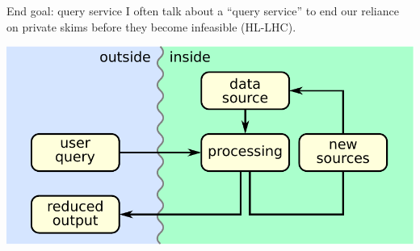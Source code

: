 \documentclass[aspectratio=169]{beamer}
\begin{document}
\begin{frame}{End goal: query service}
\large
\vspace{0.5 cm}
I often talk about a ``query service'' to end our reliance on private skims before they become infeasible (HL-LHC).

\begin{center}
\includegraphics[width=0.5\linewidth]{basic-block-diagram.pdf}
\end{center}

\end{frame}
\end{document}
